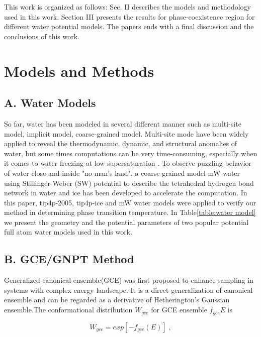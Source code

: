 \documentclass[aps,prl,twocolumn,superscriptaddress]{revtex4-1}
\begin{document}
This work is organized as follows: Sec. II describes the models and methodology used in this work. Section III presents the results for phase-coexistence region for different water potential models. The papers ends with a final discussion and the conclusions of this work.
\section{Models and Methods} 
\subsection{A. Water Models}
So far, water has been modeled in several different manner such as multi-site model\cite{Sanz2004,Bryk2002,Horn2005,Gonzalez2010,Kumar2012,Sedlmeier2011,Vega2007,Yu2013,Himoto2011}, implicit model\cite{Huißmann2012}, coarse-grained model\cite{Molinero2009,Marrink2004Coarse}. Multi-site mode have been widely applied to reveal the thermodynamic, dynamic, and structural anomalies of water\cite{Gao2000,Bryk2002,Sanz2004}, but some times computations can be very time-consuming, especially when it comes to water freezing at low supersaturation\cite{Mishima1998} . To observe puzzling behavior of water close and inside "no man's land"\cite{Moore2011}, a coarse-grained model mW water\cite{Molinero2009} using Stillinger-Weber (SW) potential to describe the tetrahedral hydrogen bond network in water and ice has been developed to accelerate the computation. In this paper, tip4p-2005, tip4p-ice and mW water models were applied to verify our method in determining phase transition temperature. In Table\ref{table:water model}  we present the geometry and the potential parameters of two popular potential full atom water models used in this work. 

\subsection{B. GCE/GNPT Method}

Generalized canonical ensemble(GCE)\cite{Xu2012} was first proposed to enhance sampling in systems with complex energy landscape. It is a direct generalization of canonical ensemble and can be regarded as a derivative of Hetherington's Gaussian ensemble.The conformational distribution $W_{gce}$ for GCE ensemble $f_{gce}{E}$ is

\begin{equation}
W_{gce}=exp[−f_{gce}(E)]\;,
\end{equation}
\end{document}
